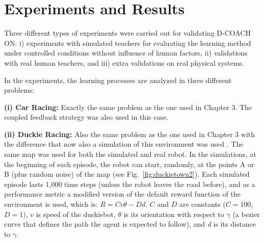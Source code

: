\section{Experiments and Results}

Three different types of experiments were carried out for validating D-COACH ON: i) experiments with simulated teachers for evaluating the learning method under controlled conditions without influence of human factors, ii) validations with real human teachers, and iii) extra validations on real physical systems.

In the experiments, the learning processes are analyzed in three different problems:

\textbf{(i) Car Racing:} Exactly the same problem as the one used in Chapter 3. The coupled feedback strategy was also used in this case. 
    
\textbf{(ii) Duckie Racing:} Also the same problem as the one used in Chapter 3 with the difference that now also a simulation of this environment was used \cite{gym_duckietown}. The same map was used for both the simulated and real robot. In the simulations, at the beginning of each episode, the robot can start, randomly, at the points A or B (plus random noise) of the map (see Fig.~\ref{fig:duckietown2}). Each simulated episode lasts 1,000 time steps (unless the robot leaves the road before), and as a performance metric a modified version of the default reward function of the environment is used, which is: $R = Cv\theta - Dd$. $C$ and $D$ are constants ($C=100$, $D=1$), $v$ is speed of the duckiebot, $\theta$ is its orientation with respect to $\gamma$ (a bezier curve that defines the path the agent is expected to follow), and \emph{d} is its distance to $\gamma$.

